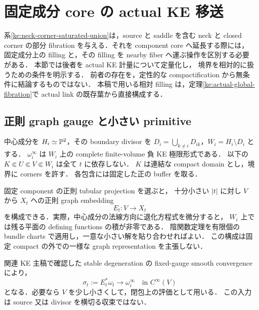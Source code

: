\section{固定成分 core の actual KE 移送}
\label{ke:component-core-transfer-section}

系\ref{ke:neck-corner-saturated-union}は，source と saddle を含む neck と
closed corner の部分 fibration を与える．それを component core へ延長する際には，
固定成分上の filling と，その filling を nearby fiber へ運ぶ操作を区別する必要がある．
本節では後者を actual KE 計量について定量化し，
境界を相対的に扱うための条件を明示する．
前者の存在を，定性的な compactification から無条件に結論するものではない．
本稿で用いる相対 filling は，定理\ref{ke:actual-global-fibration}で
actual link の既存葉から直接構成する．

\subsection{正則 graph gauge と小さい primitive}

中心成分を $H_i\simeq\mathbb P^2$，その boundary divisor を
$D_i=\bigcup_{k\ne i}D_{ik}$，$W_i=H_i\setminus D_i$ とする．
$\omega_i^\infty$ は $W_i$ 上の complete finite-volume 負 KE 極限形式である．
以下の $K\Subset U\Subset V\Subset W_i$ は全て $t$ に依存しない．
$K$ は連結な compact domain とし，境界に corners を許す．
各包含には固定した正の buffer を取る．

固定 component の正則 tubular projection を選ぶと，
十分小さい $|t|$ に対し $V$ から $X_t$ への正則 graph embedding
\[
 E_t:V\longrightarrow X_t
\]
を構成できる．実際，中心成分の法線方向に退化方程式を微分すると，
$W_i$ 上では残る平面の defining functions の積が非零である．
陰関数定理を有限個の bundle charts で適用し，一意な小さい解を貼り合わせればよい．
この構成は固定 compact の外での一様な graph representation を主張しない．

関連 KE 主稿\cite[\texttt{pair:thm:fixed-end-moment}の証明]{KELocalCurrent}で確認した
stable degeneration の fixed-gauge smooth convergence により，
\begin{equation}\label{ke:eq:component-fixed-convergence}
 \sigma_t:=E_t^*\omega_t\longrightarrow\omega_i^\infty
 \quad\text{in }C^\infty(V)
\end{equation}
となる．必要なら $V$ を少し小さくして，閉包上の評価として用いる．
この入力は source 又は divisor を横切る収束ではない．

